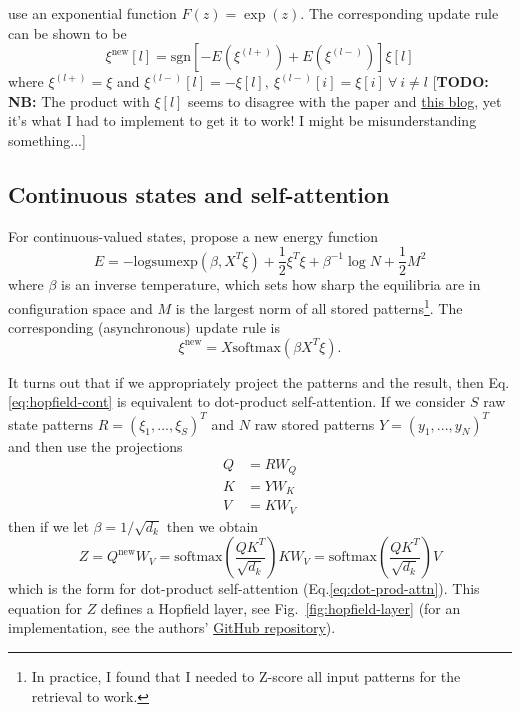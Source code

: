 \documentclass[11pt]{article}
\numberwithin{equation}{section}
\begin{document}
\cite{Demircigil17} use an exponential function $F(z) = \exp(z)$. The corresponding update rule can be shown to be
\begin{equation}
\xi^{\text{new}}[l] = \text{sgn}\left[ -E(\xi^{(l+)}) + E(\xi^{(l-)}) \right] \xi[l]
\end{equation}
where $\xi^{(l+)} = \xi$ and $\xi^{(l-)}[l] = - \xi[l],\ \xi^{(l-)}[i] = \xi[i]\ \forall\ i \neq l$ [\textbf{TODO: NB:} The product with $\xi[l]$ seems to disagree with the paper and  \href{https://ml-jku.github.io/hopfield-layers/}{this blog}, yet it's what I had to implement to get it to work! I might be misunderstanding something...]

\subsection{Continuous states and self-attention}

For continuous-valued states, \citep{Ramsauer20} propose a new energy function
\begin{equation}
E = -\text{logsumexp}(\beta, X^T \xi) + \frac{1}{2} \xi^T \xi + \beta^{-1} \log N + \frac{1}{2} M^2
\end{equation}
where $\beta$ is an inverse temperature, which sets how sharp the equilibria are in configuration space and $M$ is the largest norm of all stored patterns\footnote{In practice, I found that I needed to Z-score all input patterns for the retrieval to work.}. The corresponding (asynchronous) update rule is
\begin{equation}
\xi^{\text{new}} = X \text{softmax}(\beta X^T \xi). \label{eq:hopfield-cont}
\end{equation}

It turns out that if we appropriately project the patterns and the result, then Eq.\eqref{eq:hopfield-cont} is equivalent to dot-product self-attention. If we consider $S$ raw state patterns $R = (\xi_1,...,\xi_S)^T$ and $N$ raw stored patterns $Y=(y_1,...,y_N)^T$ and then use the projections
\begin{align}
Q&=RW_Q\\
K&=YW_K\\
V&=KW_V
\end{align}
then if we let $\beta = 1/\sqrt{d_k}$ then we obtain
\begin{equation}
Z = Q^{\text{new}}W_V = \text{softmax}\left( \frac{QK^T}{\sqrt{d_k}}\right) KW_V = \text{softmax}\left( \frac{QK^T}{\sqrt{d_k}}\right)V
\end{equation}
which is the form for dot-product self-attention (Eq.\eqref{eq:dot-prod-attn}). This equation for $Z$ defines a Hopfield layer, see Fig.~\ref{fig:hopfield-layer} (for an implementation, see the authors' \href{https://github.com/ml-jku/hopfield-layers}{GitHub repository}).
\end{document}
